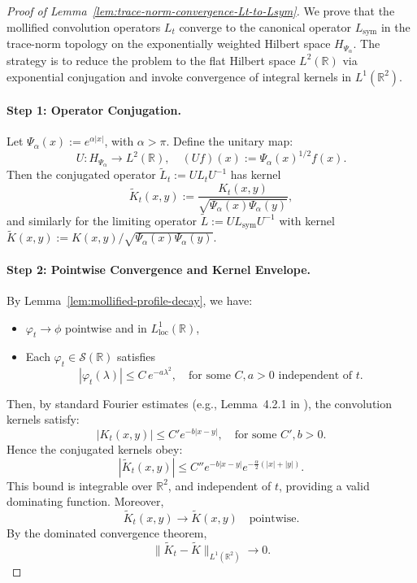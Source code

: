 \begin{proof}[Proof of Lemma~\ref{lem:trace-norm-convergence-Lt-to-Lsym}]
We prove that the mollified convolution operators \( L_t \) converge to the canonical operator \( L_{\mathrm{sym}} \) in the trace-norm topology on the exponentially weighted Hilbert space \( H_{\Psi_\alpha} \). The strategy is to reduce the problem to the flat Hilbert space \( L^2(\mathbb{R}) \) via exponential conjugation and invoke convergence of integral kernels in \( L^1(\mathbb{R}^2) \).

\paragraph{Step 1: Operator Conjugation.}
Let \( \Psi_\alpha(x) := e^{\alpha |x|} \), with \( \alpha > \pi \). Define the unitary map:
\[
U \colon H_{\Psi_\alpha} \to L^2(\mathbb{R}), \quad (Uf)(x) := \Psi_\alpha(x)^{1/2} f(x).
\]
Then the conjugated operator \( \widetilde{L}_t := U L_t U^{-1} \) has kernel
\[
\widetilde{K}_t(x,y) := \frac{K_t(x,y)}{\sqrt{\Psi_\alpha(x)\Psi_\alpha(y)}},
\]
and similarly for the limiting operator \( \widetilde{L} := U L_{\mathrm{sym}} U^{-1} \) with kernel \( \widetilde{K}(x,y) := K(x,y)/\sqrt{\Psi_\alpha(x)\Psi_\alpha(y)} \).

\paragraph{Step 2: Pointwise Convergence and Kernel Envelope.}
By Lemma~\ref{lem:mollified-profile-decay}, we have:
\begin{itemize}
  \item \( \varphi_t \to \phi \) pointwise and in \( L^1_{\text{loc}}(\mathbb{R}) \),
  \item Each \( \varphi_t \in \mathcal{S}(\mathbb{R}) \) satisfies
  \[
  |\varphi_t(\lambda)| \le C\, e^{-a \lambda^2}, \quad \text{for some } C,a>0 \text{ independent of } t.
  \]
\end{itemize}
Then, by standard Fourier estimates (e.g., Lemma~4.2.1 in \cite{ReedSimon1980I}), the convolution kernels satisfy:
\[
|K_t(x,y)| \le C' e^{-b |x - y|}, \quad \text{for some } C',b > 0.
\]
Hence the conjugated kernels obey:
\[
|\widetilde{K}_t(x,y)| \le C'' e^{-b |x - y|} e^{-\frac{\alpha}{2}(|x| + |y|)}.
\]
This bound is integrable over \( \mathbb{R}^2 \), and independent of \( t \), providing a valid dominating function. Moreover,
\[
\widetilde{K}_t(x,y) \to \widetilde{K}(x,y) \quad \text{pointwise}.
\]
By the dominated convergence theorem,
\[
\| \widetilde{K}_t - \widetilde{K} \|_{L^1(\mathbb{R}^2)} \to 0.
\]


\end{proof}
